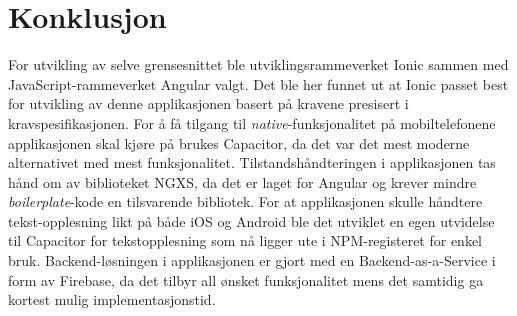 \section{Konklusjon}
For utvikling av selve grensesnittet ble utviklingsrammeverket Ionic sammen med JavaScript-rammeverket Angular valgt. Det ble her funnet ut at Ionic passet best for utvikling av denne applikasjonen basert på kravene presisert i kravspesifikasjonen. For å få tilgang til \textit{native}-funksjonalitet på mobiltelefonene applikasjonen skal kjøre på brukes Capacitor, da det var det mest moderne alternativet med mest funksjonalitet. Tilstandshåndteringen i applikasjonen tas hånd om av biblioteket NGXS, da det er laget for Angular og krever mindre \textit{boilerplate}-kode en tilsvarende bibliotek. For at applikasjonen skulle håndtere tekst-opplesning likt på både iOS og Android ble det utviklet en egen utvidelse til Capacitor for tekstopplesning som nå ligger ute i NPM-registeret for enkel bruk. Backend-løsningen i applikasjonen er gjort med en Backend-as-a-Service i form av Firebase, da det tilbyr all ønsket funksjonalitet mens det samtidig ga kortest mulig implementasjonstid.
